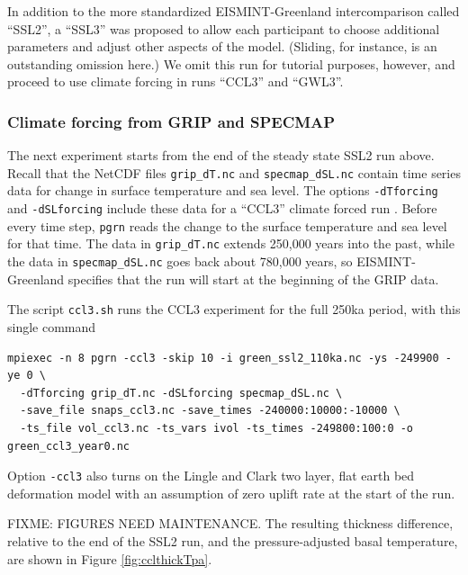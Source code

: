 \documentclass[11pt,final]{amsart}
\begin{document}
In addition to the more standardized EISMINT-Greenland intercomparison called ``SSL2'', a ``SSL3'' was proposed to allow each participant to choose additional parameters and adjust other aspects of the model.  (Sliding, for instance, is an outstanding omission here.)  We omit this run for tutorial purposes, however, and proceed to use climate forcing in runs ``CCL3'' and ``GWL3''.


\subsubsection*{Climate forcing from GRIP and SPECMAP} 
\label{sec:climate-forcing}
The next experiment starts from the end of the steady state SSL2 run above.  Recall that the NetCDF files \verb|grip_dT.nc| and \verb|specmap_dSL.nc| contain time series data for change in surface temperature and sea level.  The options \verb|-dTforcing| and \verb|-dSLforcing| include these data for a ``CCL3'' climate forced run \cite{RitzEISMINT,HuybrechtsEISMINT}.  Before every time step, \verb|pgrn| reads the change to the surface temperature and sea level for that time.  The data in \verb|grip_dT.nc| extends 250,000 years into the past, while the data in \verb|specmap_dSL.nc| goes back about 780,000 years, so EISMINT-Greenland specifies that the run will start at the beginning of the GRIP data.  

The script \texttt{ccl3.sh} runs the CCL3 experiment for the full 250ka period, with this single command
\begin{verbatim}
mpiexec -n 8 pgrn -ccl3 -skip 10 -i green_ssl2_110ka.nc -ys -249900 -ye 0 \
  -dTforcing grip_dT.nc -dSLforcing specmap_dSL.nc \
  -save_file snaps_ccl3.nc -save_times -240000:10000:-10000 \
  -ts_file vol_ccl3.nc -ts_vars ivol -ts_times -249800:100:0 -o green_ccl3_year0.nc
\end{verbatim}
\noindent Option \verb|-ccl3| also turns on the Lingle and Clark \cite{BLKfastearth,LingleClark} two layer, flat earth bed deformation model with an assumption of zero uplift rate at the start of the run.

FIXME:  FIGURES NEED MAINTENANCE.   The resulting thickness difference, relative to the end of the SSL2 run, and the pressure-adjusted basal temperature, are shown in Figure \ref{fig:cclthickTpa}.
\end{document}

